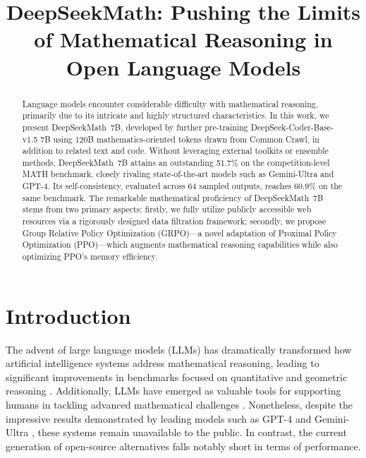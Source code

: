 \title{DeepSeekMath: Pushing the Limits of Mathematical Reasoning in Open Language Models}

\begin{abstract}
Language models encounter considerable difficulty with mathematical reasoning, primarily due to its intricate and highly structured characteristics. In this work, we present DeepSeekMath~7B, developed by further pre-training DeepSeek-Coder-Base-v1.5 7B using 120B mathematics-oriented tokens drawn from Common Crawl, in addition to related text and code. Without leveraging external toolkits or ensemble methods, DeepSeekMath~7B attains an outstanding 51.7\% on the competition-level MATH benchmark, closely rivaling state-of-the-art models such as Gemini-Ultra and GPT-4. Its self-consistency, evaluated across 64 sampled outputs, reaches 60.9\% on the same benchmark. The remarkable mathematical proficiency of DeepSeekMath~7B stems from two primary aspects: firstly, we fully utilize publicly accessible web resources via a rigorously designed data filtration framework; secondly, we propose Group Relative Policy Optimization (GRPO)—a novel adaptation of Proximal Policy Optimization (PPO)—which augments mathematical reasoning capabilities while also optimizing PPO’s memory efficiency.
\end{abstract}

\section{Introduction}

The advent of large language models (LLMs) has dramatically transformed how artificial intelligence systems address mathematical reasoning, leading to significant improvements in benchmarks focused on quantitative \citep{MATH} and geometric reasoning \citep{trinh2024solving}. Additionally, LLMs have emerged as valuable tools for supporting humans in tackling advanced mathematical challenges \citep{tao}. Nonetheless, despite the impressive results demonstrated by leading models such as GPT-4 \citep{gpt4} and Gemini-Ultra \citep{gemini}, these systems remain unavailable to the public. In contrast, the current generation of open-source alternatives falls notably short in terms of performance.

